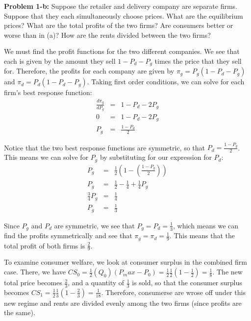 \documentclass[psamsfonts]{amsart}
\newenvironment{sol}{\vspace{0.25cm}{\large \bfseries Solution:}}{\qedsymbol}
\newenvironment{prob}[1]{\begin{framed}{\large \bfseries Problem #1:}}{\end{framed}}
\begin{document}
\begin{prob}{1-b}
Suppose the retailer and delivery company are separate firms. Suppose that they each simultaneously choose prices. What are the equilibrium prices? What are the total profits of the two firms? Are consumers better or worse than in (a)? How are the rents divided between the two firms?
\end{prob}
\begin{sol}
We must find the profit functions for the two different companies. We see that each is given by the amount they sell $1 - P_d - P_g$ times the price that they sell for. Therefore, the profits for each company are given by $\pi_g = P_g ( 1 - P_d - P_g)$ and $\pi_d = P_d ( 1 - P_d - P_g)$. Taking first order conditions, we can solve for each firm's best response function:
\begin{eqnarray}
\frac{d \pi_g}{d P_g} &=& 1 - P_d - 2 P_g \\
0 &=& 1 - P_d - 2 P_g \\
P_g &=& \frac{1 - P_d}{2}
\end{eqnarray}

Notice that the two best response functions are symmetric, so that $P_d = \frac{1 - P_g}{2}$. This means we can solve for $P_g$ by substituting for our expression for $P_d$:
\begin{eqnarray}
P_g &=& \frac{1}{2}\left(1 - \left(\frac{1 - P_g}{2} \right) \right) \\
P_g &=& \frac{1}{2} - \frac{1}{4} + \frac{1}{4} P_g \\
\frac{3}{4} P_g &=& \frac{1}{4} \\ 
P_g &=& \frac{1}{3}
\end{eqnarray}

Since $P_g$ and $P_d$ are symmetric, we see that $P_g = P_d = \frac{1}{3}$, which means we can find the profits symmetrically and see that $\pi_g = \pi_d = \frac{1}{9}$. This means that the total profit of both firms is $\frac{2}{9}$. 

To examine consumer welfare, we look at consumer surplus in the combined firm case. There, we have $CS_0 = \frac{1}{2}(Q_0)(P_max - P_0) = \frac{1}{2} \frac{1}{2} \left( 1 - \frac{1}{2} \right) = \frac{1}{8}$. The new total price becomes $\frac{2}{3}$, and a quantity of $\frac{1}{3}$ is sold, so that the consumer surplus becomes $CS_1 = \frac{1}{2} \frac{1}{3} \left( 1 - \frac{2}{3} \right) = \frac{1}{18}$. Therefore, consumerse are wrose off under this new regime and rents are divided evenly among the two firms (since profits are the same). 
\end{sol}
\end{document}
